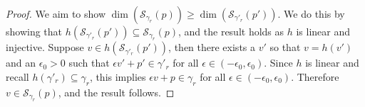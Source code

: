 \documentclass[11pt]{article} %
\newcommand{\Sc}{\mathcal{S}}  %
\begin{document}
\begin{proof}
We aim to show $\dim(\Sc_{\gamma_r}(p)) \geq \dim(\Sc_{\gamma'_r}(p'))$.
  We do this by showing that $h(\Sc_{\gamma'_r}(p')) \subseteq \Sc_{\gamma_r}(p)$, and the result holds as $h$ is linear and injective.
Suppose $v \in h(\Sc_{\gamma'_r}(p'))$, then there exists a $v'$ so that $v = h(v')$ and an $\epsilon_0 > 0$ such that $\epsilon v' + p' \in \gamma'_r$ for all $\epsilon \in (-\epsilon_0, \epsilon_0)$.
Since $h$ is linear and recall $h(\gamma'_r) \subseteq \gamma_r$, this implies $\epsilon v + p \in \gamma_r$ for all $\epsilon \in (-\epsilon_0, \epsilon_0)$.
Therefore $v \in \Sc_{\gamma_r}(p)$, and the result follows. 
  
  

\end{proof}
\end{document}
